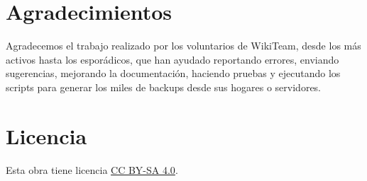 \documentclass[14pt,twocolumn]{article}
\begin{document}
\section*{Agradecimientos}

Agradecemos el trabajo realizado por los voluntarios de WikiTeam, desde los más activos hasta los esporádicos, que han ayudado reportando errores, enviando sugerencias, mejorando la documentación, haciendo pruebas y ejecutando los scripts para generar los miles de backups desde sus hogares o servidores.

\section*{Licencia}
Esta obra tiene licencia \href{http://creativecommons.org/licenses/by-sa/4.0/}{CC BY-SA 4.0}.



\end{document}

